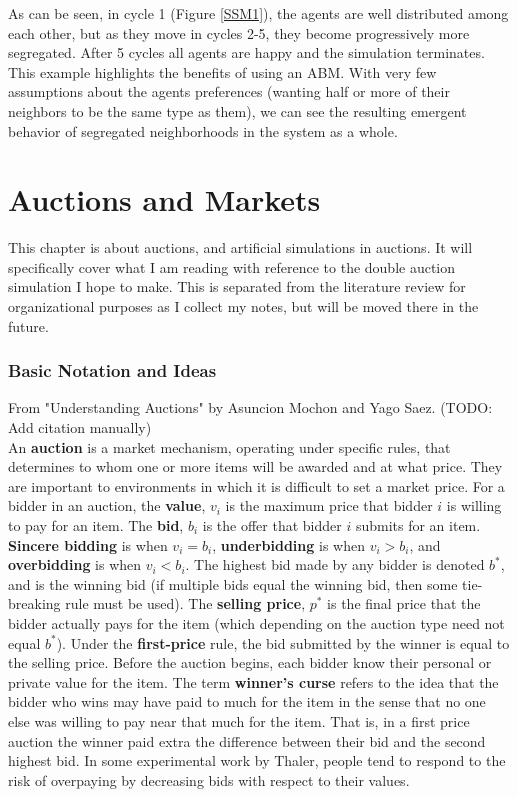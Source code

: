 \documentclass[12pt,twoside]{reedthesis}
\begin{document}
As can be seen, in cycle 1 (Figure \ref{SSM1}), the agents are well distributed among each other, but as they move in cycles 2-5, they become progressively more segregated. After 5 cycles all agents are happy and the simulation terminates. This example highlights the benefits of using an ABM. With very few assumptions about the agents preferences (wanting half or more of their neighbors to be the same type as them), we can see the resulting emergent behavior of segregated neighborhoods in the system as a whole.


\chapter{Auctions and Markets}
This chapter is about auctions, and artificial simulations in auctions. It will specifically cover what I am reading with reference to the double auction simulation I hope to make. This is separated from the literature review for organizational purposes as I collect my notes, but will be moved there in the future.

\subsection{Basic Notation and Ideas}

From "Understanding Auctions" by Asuncion Mochon and Yago Saez. (TODO: Add citation manually)\\
An \textbf{auction} is a market mechanism, operating under specific rules, that determines to whom one or more items will be awarded and at what price. They are important to environments in which it is difficult to set a market price. For a bidder in an auction, the \textbf{value}, $v_i$ is the maximum price that bidder $i$ is willing to pay for an item. The \textbf{bid}, $b_i$ is the offer that bidder $i$ submits for an item. \textbf{Sincere bidding} is when $v_i = b_i$, \textbf{underbidding} is when $v_i > b_i$, and \textbf{overbidding} is when $v_i < b_i$. The highest bid made by any bidder is denoted $b^*$, and is the winning bid (if multiple bids equal the winning bid, then some tie-breaking rule must be used). The \textbf{selling price}, $p^*$ is the final price that the bidder actually pays for the item (which depending on the auction type need not equal $b^*$). Under the \textbf{first-price} rule, the bid submitted by the winner is equal to the selling price. Before the auction begins, each bidder know their personal or private value for the item. The term \textbf{winner's curse} refers to the idea that the bidder who wins may have paid to much for the item in the sense that no one else was willing to pay near that much for the item. That is, in a first price auction the winner paid extra the difference between their bid and the second highest bid. In some experimental work by Thaler, people tend to respond to the risk of overpaying by decreasing bids with respect to their values. 
\end{document}
